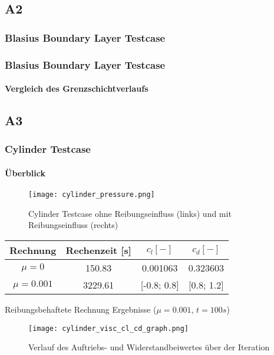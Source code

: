 \documentclass[
	11pt, %
	aspectratio=169, %
]{beamer}
\begin{document}
\subsection{A2}

\begin{frame}
	\frametitle{Blasius Boundary Layer Testcase}


\end{frame}


\begin{frame}
	\frametitle{Blasius Boundary Layer Testcase}
	\framesubtitle{Vergleich des Grenzschichtverlaufs} %
\end{frame}


\subsection{A3}
\begin{frame}
\frametitle{Cylinder Testcase}
\framesubtitle{Überblick}
\begin{figure}
	\texttt{[image: cylinder\_pressure.png]}
	\caption{Cylinder Testcase ohne Reibungseinfluss (links) und mit Reibungseinfluss (rechts)}
\end{figure}




\end{frame}
\begin{frame}
	\begin{tabular}{|c|c|c|c|}
		\hline
		Rechnung & Rechenzeit [s]& $c_l [-]$  & $c_d [-]$\\
		\hline
		$\mu = 0$ & 150.83 & 0.001063 & 0.323603\\
		\hline
		$\mu = 0.001$& 3229.61 & [-0.8; 0.8] & [0.8; 1.2]\\
		\hline
		\end{tabular}
	Reibungsbehaftete Rechnung Ergebnisse ($\mu=0.001$, $t=100s$)
	\begin{figure}
		\texttt{[image: cylinder\_visc\_cl\_cd\_graph.png]}
		\caption{Verlauf des Auftriebs- und Widerstandbeiwertes über der Iteration}
	\end{figure}
\end{frame}

\end{document}
